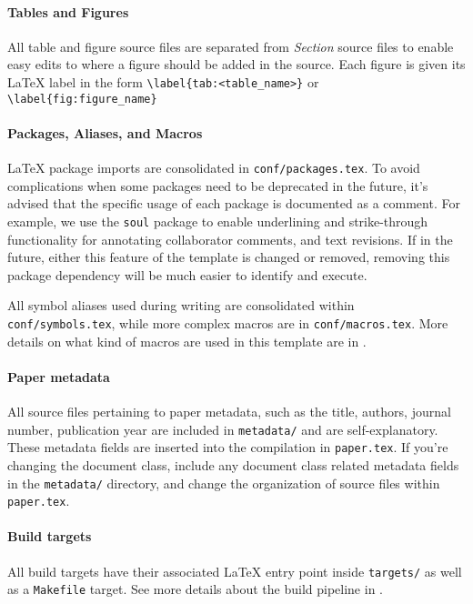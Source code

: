 \paragraph{Tables and Figures}
All table and figure source files are separated from \emph{Section} source files to enable easy edits to where a figure should be added in the source.
Each figure is given its \LaTeX\xspace label in the form \texttt{\textbackslash label\{tab:<table\_name>\}} or \texttt{\textbackslash label\{fig:figure\_name\}}

\paragraph{Packages, Aliases, and Macros}
\LaTeX\xspace package imports are consolidated in \texttt{conf/packages.tex}.
To avoid complications when some packages need to be deprecated in the future, it's advised that the specific usage of each package is documented as a comment.
For example, we use the \texttt{soul} package to enable underlining and strike-through functionality for annotating collaborator comments, and text revisions.
If in the future, either this feature of the template is changed or removed, removing this package dependency will be much easier to identify and execute.

All symbol aliases used during writing are consolidated within \texttt{conf/symbols.tex}, while more complex macros are in \texttt{conf/macro\hfill\break s.tex}.
More details on what kind of macros are used in this template are in .

\paragraph{Paper metadata}
All source files pertaining to paper metadata, such as the title, authors, journal number, publication year \etc are included in \texttt{metadata/} and are self-explanatory.
These metadata fields are inserted into the compilation in \texttt{paper.tex}.
If you're changing the document class, include any document class related metadata fields in the \texttt{metadata/} directory, and change the organization of source files within \texttt{paper.tex}.

\paragraph{Build targets}
All build targets have their associated \LaTeX\xspace entry point inside \texttt{targets/} as well as a  \texttt{Makefile} target.
See more details about the build pipeline in .

